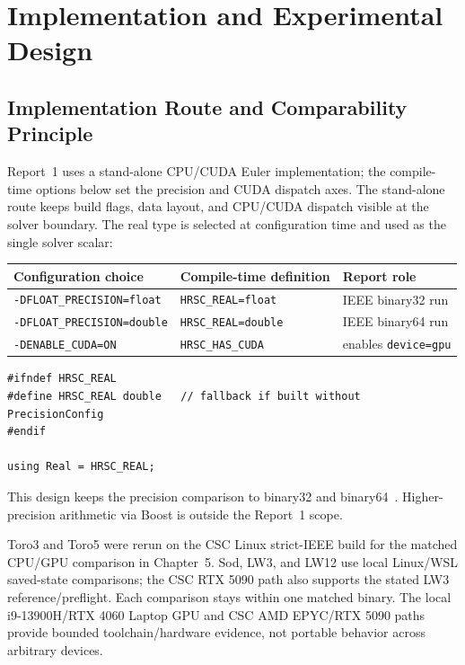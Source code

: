 
\chapter{Implementation and Experimental Design}

\section{Implementation Route and Comparability Principle}
\label{sec:implementation-route}
Report~1 uses a stand-alone CPU/CUDA Euler implementation; the compile-time options below set the precision and CUDA dispatch axes. The stand-alone route keeps build flags, data layout, and CPU/CUDA dispatch visible at the solver boundary. The real type is selected at configuration time and used as the single solver scalar:

\begin{center}
\begin{tabular}{lll}
\toprule
Configuration choice & Compile-time definition & Report role \\
\midrule
\texttt{-DFLOAT\_PRECISION=float}  & \texttt{HRSC\_REAL=float}  & IEEE binary32 run \\
\texttt{-DFLOAT\_PRECISION=double} & \texttt{HRSC\_REAL=double} & IEEE binary64 run \\
\texttt{-DENABLE\_CUDA=ON}         & \texttt{HRSC\_HAS\_CUDA}   & enables \texttt{device=gpu} \\
\bottomrule
\end{tabular}
\end{center}

\begin{lstlisting}[style=fpListing,
  caption={Compile-time precision selection (\texttt{src/main.cpp}). The build system sets \texttt{HRSC\_REAL} via \texttt{-DFLOAT\_PRECISION=float|double}; every solver object in the main translation unit then uses the single \texttt{Real} alias.},
  label=lst:hrsc-real]
#ifndef HRSC_REAL
#define HRSC_REAL double   // fallback if built without PrecisionConfig
#endif

using Real = HRSC_REAL;
\end{lstlisting}

This design keeps the precision comparison to binary32 and binary64~\citep{ieee754_2019}. Higher-precision arithmetic via Boost \citep{maddock_boost_multiprecision} is outside the Report~1 scope.

Toro3 and Toro5 were rerun on the CSC Linux strict-IEEE build for the matched CPU/GPU comparison in Chapter~5. Sod, LW3, and LW12 use local Linux/WSL saved-state comparisons; the CSC RTX 5090 path also supports the stated LW3 reference/preflight. Each comparison stays within one matched binary. The local i9-13900H/RTX 4060 Laptop GPU and CSC AMD EPYC/RTX 5090 paths provide bounded toolchain/hardware evidence, not portable behavior across arbitrary devices.

